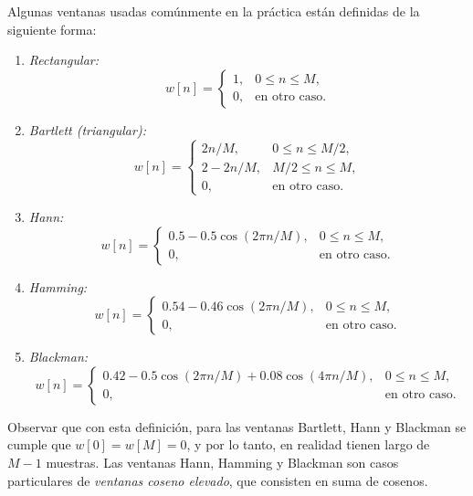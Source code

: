 \documentclass[a4paper]{report}
\begin{document}
Algunas ventanas usadas comúnmente en la práctica están definidas de la siguiente forma:
\begin{enumerate}
 \item \emph{Rectangular:}
 \begin{equation}\label{eq:filter_design_windowing_definition_rectangular}
  w[n]=\left\{ 
   \begin{array}{ll}
     1, & 0\leq n\leq M,\\ 
     0, & \textrm{en otro caso.}
   \end{array}
 \right. 
 \end{equation}
 \item \emph{Bartlett (triangular):}
 \begin{equation}\label{eq:filter_design_windowing_definition_triangular}
  w[n]=\left\{ 
   \begin{array}{ll}
     2n/M, & 0\leq n\leq M/2,\\
     2-2n/M, & M/2\leq n\leq M,\\
     0, & \textrm{en otro caso.}
   \end{array}
 \right. 
 \end{equation}
 \item \emph{Hann:}
 \begin{equation}\label{eq:filter_design_windowing_definition_hann}
  w[n]=\left\{ 
   \begin{array}{ll}
     0.5-0.5\cos(2\pi n/M), & 0\leq n\leq M,\\
     0, & \textrm{en otro caso.}
   \end{array}
 \right. 
 \end{equation}
 \item \emph{Hamming:}
 \begin{equation}\label{eq:filter_design_windowing_definition_hamming}
  w[n]=\left\{ 
   \begin{array}{ll}
     0.54-0.46\cos(2\pi n/M), & 0\leq n\leq M,\\
     0, & \textrm{en otro caso.}
   \end{array}
 \right. 
 \end{equation}
 \item \emph{Blackman:}
 \begin{equation}\label{eq:filter_design_windowing_definition_blackman}
  w[n]=\left\{ 
   \begin{array}{ll}
     0.42-0.5\cos(2\pi n/M)+0.08\cos(4\pi n/M), & 0\leq n\leq M,\\
     0, & \textrm{en otro caso.}
   \end{array}
 \right. 
 \end{equation}
\end{enumerate}
Observar que con esta definición, para las ventanas Bartlett, Hann y Blackman se cumple que \(w[0]=w[M]=0\), y por lo tanto, en realidad tienen largo de \(M-1\) muestras. Las ventanas Hann, Hamming y Blackman son casos particulares de \emph{ventanas coseno elevado}, que consisten en suma de cosenos.
\end{document}
